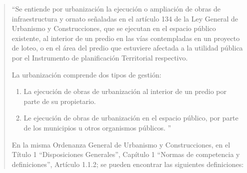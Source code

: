 \begin{quote}
``Se entiende por
urbanización la ejecución o ampliación de obras de infraestructura y ornato señaladas en el artículo
134 de la Ley General de Urbanismo y Construcciones, que se ejecutan en el espacio público
existente, al interior de un predio en las vías contempladas en un proyecto de loteo, o en el área
del predio que estuviere afectada a la utilidad pública por el Instrumento de planificación
Territorial respectivo.

La urbanización comprende dos tipos de gestión:
\begin{enumerate}
  \item La ejecución de obras de urbanización al interior de un predio por parte de su propietario.
  \item Le ejecución de obras de urbanización en el espacio público, por parte de los municipios u otros
        organismos públicos. ''
\end{enumerate}

En la misma Ordenanza General de Urbanismo y Construcciones, en el Título 1 ``Disposiciones
Generales'', Capítulo 1 ``Normas de competencia y definiciones'', Artículo 1.1.2; se pueden
encontrar las siguientes definiciones:


\end{quote}
